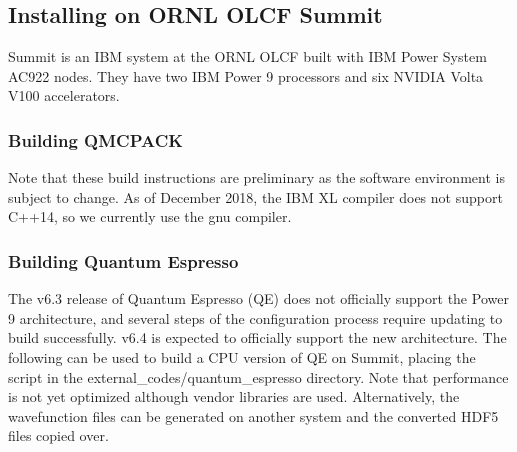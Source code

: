 \subsection{Installing on ORNL OLCF Summit}
Summit is an IBM system at the ORNL OLCF built with IBM Power System AC922
nodes. They have two IBM Power 9 processors and six NVIDIA Volta V100
accelerators.

\subsubsection{Building QMCPACK}
Note that these build instructions are preliminary as the
software environment is subject to change. As of December 2018, the
IBM XL compiler does not support C++14, so we currently use the
gnu compiler. 


\subsubsection{Building Quantum Espresso}
The v6.3 release of Quantum Espresso (QE) does not officially support the
Power 9 architecture, and several steps of the configuration process
require updating to build successfully. v6.4 is expected to officially support
the new architecture. The following can be used to build a
CPU version of QE on Summit, placing the script in the
external\_codes/quantum\_espresso directory. Note that performance is
not yet optimized although vendor libraries are
used. Alternatively, the wavefunction files can be generated on
another system and the converted HDF5 files copied over.


